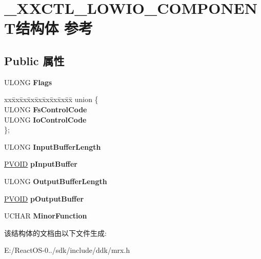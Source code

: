 \hypertarget{struct___x_x_c_t_l___l_o_w_i_o___c_o_m_p_o_n_e_n_t}{}\section{\+\_\+\+X\+X\+C\+T\+L\+\_\+\+L\+O\+W\+I\+O\+\_\+\+C\+O\+M\+P\+O\+N\+E\+N\+T结构体 参考}
\label{struct___x_x_c_t_l___l_o_w_i_o___c_o_m_p_o_n_e_n_t}
\subsection*{Public 属性}
\begin{DoxyCompactItemize}
\item 
\mbox{\label{struct___x_x_c_t_l___l_o_w_i_o___c_o_m_p_o_n_e_n_t_aa7cb5b6334f300f5478b44b9be10317b}} 
U\+L\+O\+NG {\bfseries Flags}
\item 
\mbox{\label{struct___x_x_c_t_l___l_o_w_i_o___c_o_m_p_o_n_e_n_t_a8140746399232480bb238b7bf2f69dff}} 
\begin{tabbing}
xx\=xx\=xx\=xx\=xx\=xx\=xx\=xx\=xx\=\kill
union \{\\
\>ULONG {\bfseries FsControlCode}\\
\>ULONG {\bfseries IoControlCode}\\
\}; \\

\end{tabbing}\item 
\mbox{\label{struct___x_x_c_t_l___l_o_w_i_o___c_o_m_p_o_n_e_n_t_a7ef77620e3ed87e8992ad74399c9d37c}} 
U\+L\+O\+NG {\bfseries Input\+Buffer\+Length}
\item 
\mbox{\label{struct___x_x_c_t_l___l_o_w_i_o___c_o_m_p_o_n_e_n_t_a8bb390673f6105262d24736a47509f38}} 
\hyperlink{interfacevoid}{P\+V\+O\+ID} {\bfseries p\+Input\+Buffer}
\item 
\mbox{\label{struct___x_x_c_t_l___l_o_w_i_o___c_o_m_p_o_n_e_n_t_a12b8d30c0f1215a482c159049d592747}} 
U\+L\+O\+NG {\bfseries Output\+Buffer\+Length}
\item 
\mbox{\label{struct___x_x_c_t_l___l_o_w_i_o___c_o_m_p_o_n_e_n_t_aeae0471db7391beb022c8623f8722c19}} 
\hyperlink{interfacevoid}{P\+V\+O\+ID} {\bfseries p\+Output\+Buffer}
\item 
\mbox{\label{struct___x_x_c_t_l___l_o_w_i_o___c_o_m_p_o_n_e_n_t_ac602a1249095ae985a43f76a318a0800}} 
U\+C\+H\+AR {\bfseries Minor\+Function}
\end{DoxyCompactItemize}


该结构体的文档由以下文件生成\+:\begin{DoxyCompactItemize}
\item 
E\+:/\+React\+O\+S-\/0../sdk/include/ddk/mrx.\+h\end{DoxyCompactItemize}
